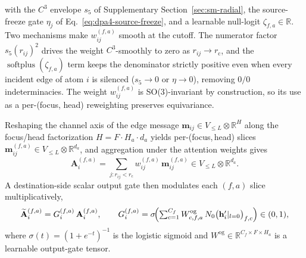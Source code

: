 with the $C^3$ envelope $s_5$ of Supplementary Section~\ref{sec:sm-radial}, the
source-freeze gate $\eta_j$ of Eq.~\eqref{eq:dpa4-source-freeze}, and a
learnable null-logit $\zeta_{f,a}\in\mathbb{R}$.
Two mechanisms make $w_{ij}^{(f,a)}$ smooth at the cutoff.
The numerator factor $s_5(r_{ij})^2$ drives the weight $C^3$-smoothly to zero as $r_{ij}\to r_{\mathrm{c}}$, and the $\operatorname{softplus}(\zeta_{f,a})$ term keeps the denominator strictly positive even when every incident edge of atom $i$ is silenced ($s_5\to 0$ or $\eta\to 0$), removing $0/0$ indeterminacies.
The weight $w_{ij}^{(f,a)}$ is SO(3)-invariant by construction, so its use as a per-(focus, head) reweighting preserves equivariance.

Reshaping the channel axis of the edge message $\mathbf m_{ij}\in V_{\le
            L}\otimes\mathbb{R}^{H}$ along the focus/head factorization $H=F\cdot H_a\cdot
    d_a$ yields per-(focus,\,head) slices $\mathbf m_{ij}^{(f,a)}\in V_{\le
            L}\otimes\mathbb{R}^{d_a}$, and aggregation under the attention weights gives
\begin{equation}
    \mathbf A_i^{(f,a)}
    =\sum_{j:r_{ij}<r_{\mathrm{c}}}w_{ij}^{(f,a)}\,\mathbf m_{ij}^{(f,a)}
    \in V_{\le L}\otimes\mathbb{R}^{d_a}.
    \label{eq:dpa4-attn-agg}
\end{equation}
A destination-side scalar output gate then modulates each $(f,a)$ slice
multiplicatively,
\begin{equation}
    \widetilde{\mathbf A}_i^{(f,a)}
    = G_i^{(f,a)}\,\mathbf A_i^{(f,a)},
    \qquad
    G_i^{(f,a)}
    = \sigma\!\Bigl(
    \textstyle\sum_{c=1}^{C_f}
    W^{\mathrm{og}}_{c,f,a}\, N_0\bigl(\mathbf h_i'|_{l=0}\bigr)_{f,c} \Bigr)\in(0,1), \label{eq:dpa4-attn-gate} \end{equation} where $\sigma(t)=(1+e^{-t})^{-1}$ is the logistic sigmoid and $W^{\mathrm{og}}\in\mathbb{R}^{C_f\times F\times H_a}$ is a learnable output-gate tensor.

